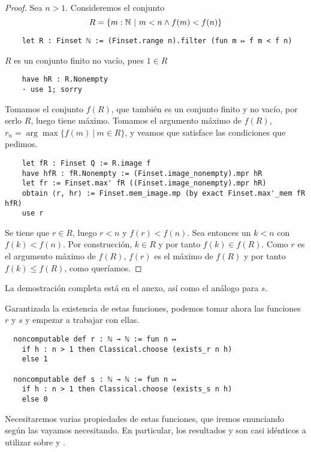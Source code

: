 \begin{proof}
  Sea $n>1$. Consideremos el conjunto
  $$
  R = \{m : \mathbb{N} ~|~ m < n \land f(m) < f(n)\}
  $$
  \begin{lstlisting}
    let R : Finset ℕ := (Finset.range n).filter (fun m ↦ f m < f n) \end{lstlisting}
  $R$ es un conjunto finito no vacío, pues $1 \in R$
  \begin{lstlisting}
    have hR : R.Nonempty
    · use 1; sorry \end{lstlisting}

  Tomamos el conjunto $f(R)$, que también es un conjunto finito y no vacío, por serlo $R$, luego tiene máximo. Tomamos el argumento máximo de $f(R)$, $r_n = \arg \max \{f(m) ~|~ m \in R\}$, y veamos que satisface las condiciones que pedimos.

  \begin{lstlisting}
    let fR : Finset Q := R.image f
    have hfR : fR.Nonempty := (Finset.image_nonempty).mpr hR
    let fr := Finset.max' fR ((Finset.image_nonempty).mpr hR)
    obtain ⟨r, hr⟩ := Finset.mem_image.mp (by exact Finset.max'_mem fR hfR)
    use r
  \end{lstlisting}

  Se tiene que $r \in R$, luego $r < n$ y $f(r) < f(n)$. Sea entonces un $k < n$ con $f(k) < f(n)$. Por construcción, $k \in R$ y por tanto $f(k) \in f(R)$. Como $r$ es el argumento máximo de $f(R)$, $f(r)$ es el máximo de $f(R)$ y por tanto $f(k) \leq f(R)$, como queríamos.
\end{proof}

La demostración completa está en el anexo, así como el análogo para $s$.

Garantizada la existencia de estas funciones, podemos tomar ahora las funciones $r$ y $s$ y empezar a trabajar con ellas.

\begin{lstlisting}
  noncomputable def r : ℕ → ℕ := fun n ↦
    if h : n > 1 then Classical.choose (exists_r n h)
    else 1

  noncomputable def s : ℕ → ℕ := fun n ↦
    if h : n > 1 then Classical.choose (exists_s n h)
    else 0
\end{lstlisting}

Necesitaremos varias propiedades de estas funciones, que iremos enunciando según las vayamos necesitando. En particular, los resultados  y  son casi idénticos a utilizar  sobre  y .

